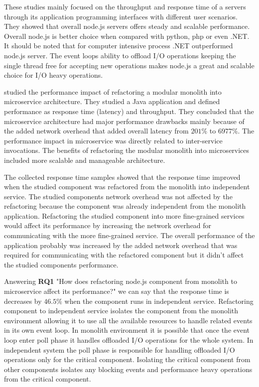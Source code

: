 These studies mainly focused on the throughput and response time of a servers through its application programming interfaces with different user scenarios.
They showed that overall node.js servers offers steady and scalable performance.
Overall node.js is better choice when compared with python, php or even .NET.
It should be noted that for computer intensive process .NET outperformed node.js server.
The event loops ability to offload I/O operations keeping the single thread free for accepting new operations makes node.js a great and scalable choice for I/O heavy operations.

\cite{SelakovicPerformanceIssues} studied the performance impact of refactoring a modular monolith into microservice architecture.
They studied a Java application and defined performance as response time (latency) and throughput.
They concluded that the microservice architecture had major performance drawbacks mainly because of the added network overhead that added overall latency from $201\%$ to $6977\%$.
The performance impact in microservice was directly related to inter-service invocations.
The benefits of refactoring the modular monolith into microservices included more scalable and manageable architecture.

The collected response time samples showed that the response time improved when the studied component was refactored from the monolith into independent service.
The studied components network overhead was not affected by the refactoring because the component was already independent from the monolith application.
Refactoring the studied component into more fine-grained services would affect its performance by increasing the network overhead for communicating with the more fine-grained service.
The overall performance of the application probably was increased by the added network overhead that was required for communicating with the refactored component but it didn't affect the studied components performance.

Answering \textbf{RQ1} "How does refactoring node.js component from monolith to microservice affect its performance?" we can say that the response time is decreases by $46.5\%$ when the component runs in independent service.
Refactoring component to independent service isolates the component from the monolith environment allowing it to use all the available resources to handle related events in its own event loop.
In monolith environment it is possible that once the event loop enter poll phase it handles offloaded I/O operations for the whole system.
In independent system the poll phase is responsible for handling offloaded I/O operations only for the critical component.
Isolating the critical component from other components isolates any blocking events and performance heavy operations from the critical component.

